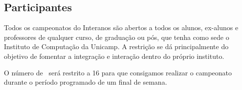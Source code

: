 \subsection{Participantes}

Todos os campeonatos do Interanos são abertos a todos os alunos, ex-alunos e professores de qualquer curso, de graduação ou pós, que tenha como sede o Instituto de Computação da Unicamp. A restrição se dá principalmente do objetivo de fomentar a integração e interação dentro do próprio instituto.

O número de \BasicUnitPl\ será restrito a 16 para que consigamos realizar o campeonato durante o período programado de um final de semana.
